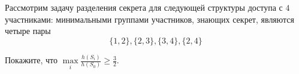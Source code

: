 Рассмотрим задачу разделения секрета для следующей структуры доступа с $4$ участниками: минимальными
группами участников, знающих секрет, являются четыре пары
$$
    \{1, 2\}, \{2, 3\}, \{3, 4\}, \{2, 4\}
$$

Покажите, что $\max\limits_i \frac{h(S_i)}{h(S_0)} \ge \frac{3}{2}$.
    